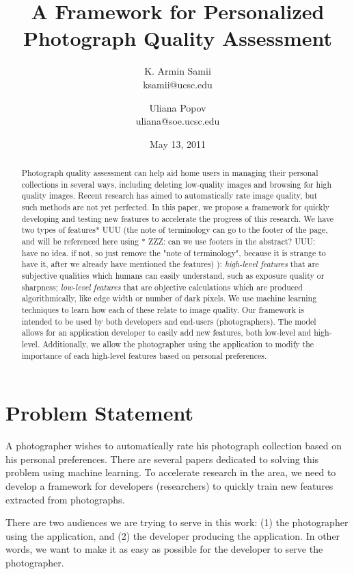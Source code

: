 \documentclass[11pt,letter]{article}
\title{A Framework for Personalized Photograph Quality Assessment}
\author{
K. Armin Samii \\
ksamii@ucsc.edu
\and
Uliana Popov \\
uliana@soe.ucsc.edu}
\date{May 13, 2011}
\begin{document}
\maketitle
\begin{abstract}
Photograph quality assessment can help aid home users in managing their personal collections in several ways, including deleting low-quality images and browsing for high quality images. Recent research has aimed to automatically rate image quality, but such methods are not yet perfected. In this paper, we propose a framework for quickly developing and testing new features to accelerate the progress of this research. We have two types of features* UUU (the note of terminology can go to the footer of the page, and will be referenced here using * ZZZ: can we use footers in the abstract?  UUU: have no idea. if not, so just
remove the "note of terminology", because it is strange to have it,
after we already have mentioned the features)
): \textit{high-level features} that are subjective qualities which humans can easily understand, such as exposure quality or sharpness; \textit{low-level features} that are objective calculations which are produced algorithmically, like edge width or number of dark pixels. We use machine learning techniques to learn how each of these relate to image quality. 
Our framework is intended to be used by both developers and end-users (photographers). 
The model allows for an application developer to easily add new features, both low-level and high-level. Additionally, we allow the photographer using the application to modify the importance of each high-level features based on personal preferences.

\end{abstract}

\section{Problem Statement}
A photographer wishes to automatically rate his photograph collection based on his personal preferences. There are several papers dedicated to solving this problem using machine learning\cite{springerlink:10.1007/11744078_23}\cite{springerlink:10.1007/978-3-642-10543-2_23}\cite{Yeh:2010:PPR:1873951.1873963}. To accelerate research in the area, we need to develop a framework for developers (researchers) to quickly train new features extracted from photographs.

There are two audiences we are trying to serve in this work: (1) the photographer using the application, and (2) the developer producing the application. In other words, we want to make it as easy as possible for the developer to serve the photographer.
\end{document}
